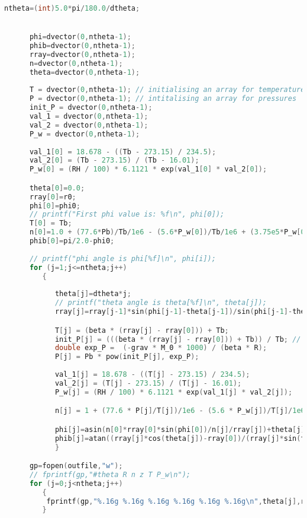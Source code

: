 \documentclass{article}
\begin{document}
\begin{footnotesize}
\begin{lstlisting}[language=c,showstringspaces=false]
      ntheta=(int)5.0*pi/180.0/dtheta;


      phi=dvector(0,ntheta-1);
      phib=dvector(0,ntheta-1);
      rray=dvector(0,ntheta-1);
      n=dvector(0,ntheta-1);
      theta=dvector(0,ntheta-1);
     
      T = dvector(0,ntheta-1); // initialising an array for temperatures
      P = dvector(0,ntheta-1); // intitalising an array for pressures
      init_P = dvector(0,ntheta-1);
      val_1 = dvector(0,ntheta-1); 
      val_2 = dvector(0,ntheta-1);
      P_w = dvector(0,ntheta-1);
     
      val_1[0] = 18.678 - ((Tb - 273.15) / 234.5);
      val_2[0] = (Tb - 273.15) / (Tb - 16.01);
      P_w[0] = (RH / 100) * 6.1121 * exp(val_1[0] * val_2[0]);

      theta[0]=0.0;
      rray[0]=r0;
      phi[0]=phi0;
      // printf("First phi value is: %f\n", phi[0]);
      T[0] = Tb;
      n[0]=1.0 + (77.6*Pb)/Tb/1e6 - (5.6*P_w[0])/Tb/1e6 + (3.75e5*P_w[0])/pow(Tb, 2)/1e6;
      phib[0]=pi/2.0-phi0;
   
      // printf("phi angle is phi[%f]\n", phi[i]);
      for (j=1;j<=ntheta;j++)
         {
            
            theta[j]=dtheta*j;
            // printf("theta angle is theta[%f]\n", theta[j]);
            rray[j]=rray[j-1]*sin(phi[j-1]-theta[j-1])/sin(phi[j-1]-theta[j]);

            T[j] = (beta * (rray[j] - rray[0])) + Tb;
            init_P[j] = (((beta * (rray[j] - rray[0])) + Tb)) / Tb; // (in hPa)
            double exp_P =  (-grav * M_0 * 1000) / (beta * R);
            P[j] = Pb * pow(init_P[j], exp_P);
            
            val_1[j] = 18.678 - ((T[j] - 273.15) / 234.5);
            val_2[j] = (T[j] - 273.15) / (T[j] - 16.01);
            P_w[j] = (RH / 100) * 6.1121 * exp(val_1[j] * val_2[j]);

            n[j] = 1 + (77.6 * P[j]/T[j])/1e6 - (5.6 * P_w[j])/T[j]/1e6 + (3.75e5 * P_w[j])/pow(T[j], 2)/1e6;

            phi[j]=asin(n[0]*rray[0]*sin(phi[0])/n[j]/rray[j])+theta[j];
            phib[j]=atan((rray[j]*cos(theta[j])-rray[0])/(rray[j]*sin(theta[j]))); /* bhatdotrhatv */       
            }

      gp=fopen(outfile,"w");
      // fprintf(gp,"#theta R n z T P_w\n");
      for (j=0;j<ntheta;j++)
         {
          fprintf(gp,"%.16g %.16g %.16g %.16g %.16g %.16g\n",theta[j],rray[j],n[j],phi[j]-theta[j],T[j],P_w[j]);
         }


\end{lstlisting}
\end{footnotesize}
\end{document}
